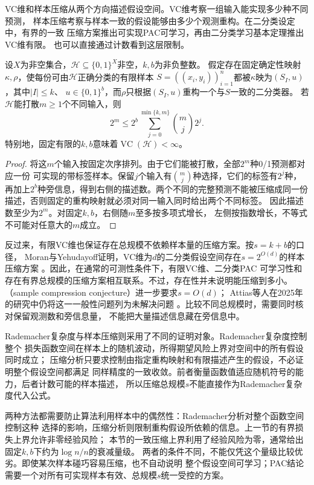 VC维和样本压缩从两个方向描述假设空间。VC维考察一组输入能实现多少种不同预测，
样本压缩考察与样本一致的假设能够由多少个观测重构。在二分类设定中，有界的一致
压缩方案推出可实现PAC可学习，再由二分类学习基本定理推出VC维有限。
也可以直接通过计数看到这层限制。

\begin{theorem}[压缩参数对打散的限制]
\label{thm:compression-shattering-count}
设$X$为非空集合，$\mathcal H\subseteq\{0,1\}^X$非空，$k,b$为非负整数。
假定存在固定确定性映射$\kappa,\rho$，使每份可由$\mathcal H$正确分类的有限样本
$S=((x_i,y_i))_{i=1}^n$都被$\kappa$映为$(S_I,u)$，其中$|I|\leq k$、
$u\in\{0,1\}^b$，而$\rho$只根据$(S_I,u)$重构一个与$S$一致的二分类器。
若$\mathcal H$能打散$m\geq1$个不同输入，则
\[
 2^m\leq 2^b\sum_{j=0}^{\min\{k,m\}}\binom mj2^j.
\]
特别地，固定有限的$k,b$意味着$\operatorname{VC}(\mathcal H)<\infty$。
\end{theorem}

\begin{proof}
将这$m$个输入按固定次序排列。由于它们能被打散，全部$2^m$种0/1预测都对应一份
可实现的带标签样本。保留$j$个输入有$\binom mj$种选择，它们的标签有$2^j$种，
再加上$2^b$种旁信息，得到右侧的描述数。两个不同的完整预测不能被压缩成同一份
描述，否则固定的重构映射就必须对同一输入同时给出两个不同标签。
因此描述数至少为$2^m$。对固定$k,b$，右侧随$m$至多按多项式增长，
左侧按指数增长，不等式不可能对任意大的$m$成立。
\end{proof}

反过来，有限VC维也保证存在总规模不依赖样本量的压缩方案。按$s=k+b$的口径，
Moran与Yehudayoff证明，VC维为$d$的二分类假设空间存在$s=2^{O(d)}$的样本压缩方案
。因此，在通常的可测性条件下，有限VC维、二分类PAC
可学习性和存在有界总规模的压缩方案相互联系。不过，存在性并未说明能压缩到多小。
（sample compression conjecture）进一步要求$s=O(d)$；
Attias等人在2025年的研究中仍将这一一般性问题列为未解决问题
。比较不同总规模时，需要同时核对保留观测数和旁信息量，
不能把大量描述信息藏在旁信息中。

Rademacher复杂度与样本压缩则采用了不同的证明对象。Rademacher复杂度控制整个
损失函数空间在样本上的随机波动，所得期望风险上界对空间中的所有假设同时成立；
压缩分析只要求控制由指定重构映射和有限描述产生的假设，不必证明整个假设空间都满足
同样精度的一致收敛。前者衡量函数值适应随机符号的能力，后者计数可能的样本描述，
所以压缩总规模$s$不能直接作为Rademacher复杂度代入公式。

两种方法都需要防止算法利用样本中的偶然性：Rademacher分析对整个函数空间控制这种
选择的影响，压缩分析则限制重构假设所依赖的信息。上一节的有界损失上界允许非零经验风险；
本节的一致压缩上界利用了经验风险为零，通常给出固定$k,b$下约为$\log n/n$的衰减量级。
两者的条件不同，不能仅凭这个量级比较优劣。即使某次样本碰巧容易压缩，也不自动说明
整个假设空间可学习；PAC结论需要一个对所有可实现样本有效、总规模$s$统一受控的方案。

